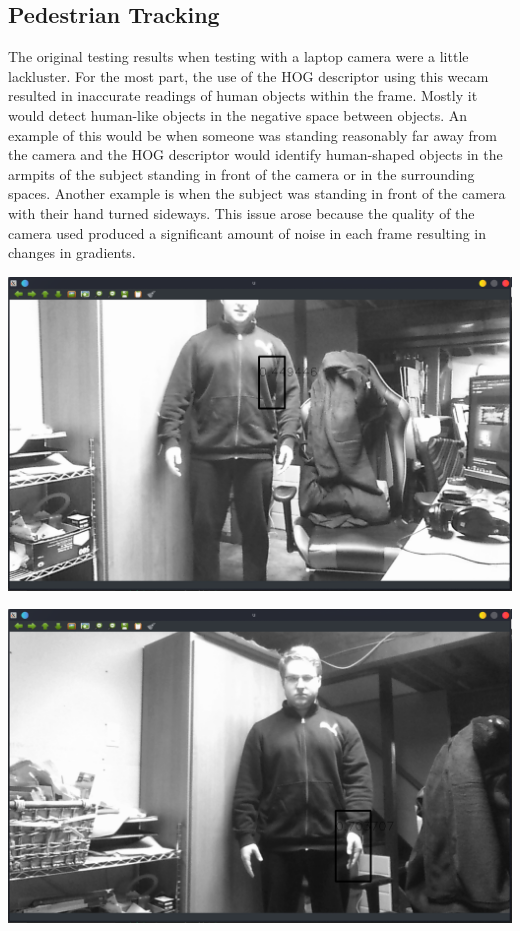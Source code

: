 \subsection{Pedestrian Tracking}
The original testing results when testing with a laptop camera were a little lackluster. For the most part, the use of the HOG descriptor using this wecam resulted in inaccurate readings of human objects within the frame. Mostly it would detect human-like objects in the negative space between objects. An example of this would be when someone was standing reasonably far away from the camera and the HOG descriptor would identify human-shaped objects in the armpits of the subject standing in front of the camera or in the surrounding spaces. Another example is when the subject was standing in front of the camera with their hand turned sideways. This issue arose because the quality of the camera used produced a significant amount of noise in each frame resulting in changes in gradients.\\

\begin{center}
    \includegraphics[width=\textwidth]{figures/PT_webcam_armpit.png}
\end{center}

\begin{center}
    \includegraphics[width=\textwidth]{figures/PT_webcam_hand.png}
\end{center}

